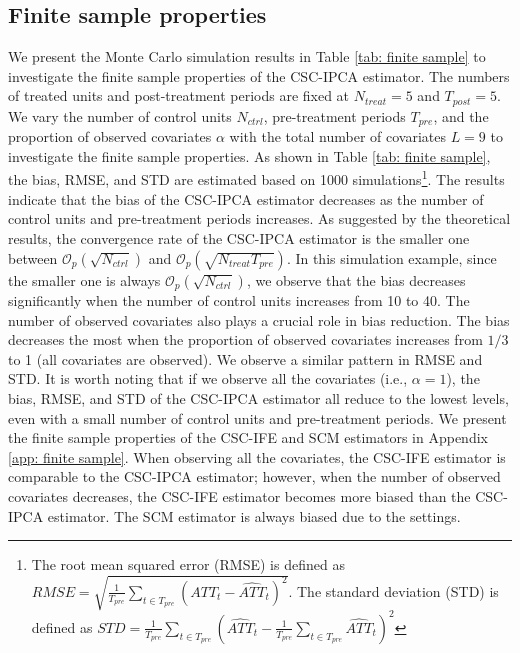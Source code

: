 \documentclass[12pt]{article}
\begin{document}
\subsection{Finite sample properties}
\label{sec: finite sample}
We present the Monte Carlo simulation results in Table \ref{tab: finite sample} to investigate the finite sample properties of the CSC-IPCA estimator. The numbers of treated units and post-treatment periods are fixed at $N_{treat} = 5$ and $T_{post} = 5$. We vary the number of control units $N_{ctrl}$, pre-treatment periods $T_{pre}$, and the proportion of observed covariates $\alpha$ with the total number of covariates $L = 9$ to investigate the finite sample properties. As shown in Table \ref{tab: finite sample}, the bias, RMSE, and STD are estimated based on 1000 simulations\footnote{The root mean squared error (RMSE) is defined as $RMSE = \sqrt{\frac{1}{T_{pre}} \sum_{t \in T_{pre}} \left(ATT_t - \widehat{ATT}_t \right)^2}$. The standard deviation (STD) is defined as $STD = \frac{1}{T_{pre}} \sum_{t \in T_{pre}} \left(\widehat{ATT}_t - \frac{1}{T_{pre}} \sum_{t \in T_{pre}} \widehat{ATT}_t \right)^2$}. The results indicate that the bias of the CSC-IPCA estimator decreases as the number of control units and pre-treatment periods increases. As suggested by the theoretical results, the convergence rate of the CSC-IPCA estimator is the smaller one between $\mathcal{O}_p\left(\sqrt{N_{ctrl}}\right)$ and $\mathcal{O}_p\left(\sqrt{N_{treat}T_{pre}}\right)$. In this simulation example, since the smaller one is always $\mathcal{O}_p\left(\sqrt{N_{ctrl}}\right)$, we observe that the bias decreases significantly when the number of control units increases from 10 to 40. The number of observed covariates also plays a crucial role in bias reduction. The bias decreases the most when the proportion of observed covariates increases from $1/3$ to 1 (all covariates are observed). We observe a similar pattern in RMSE and STD. It is worth noting that if we observe all the covariates (i.e., $\alpha = 1$), the bias, RMSE, and STD of the CSC-IPCA estimator all reduce to the lowest levels, even with a small number of control units and pre-treatment periods. We present the finite sample properties of the CSC-IFE and SCM estimators in Appendix \ref{app: finite sample}. When observing all the covariates, the CSC-IFE estimator is comparable to the CSC-IPCA estimator; however, when the number of observed covariates decreases, the CSC-IFE estimator becomes more biased than the CSC-IPCA estimator. The SCM estimator is always biased due to the settings.
\end{document}
